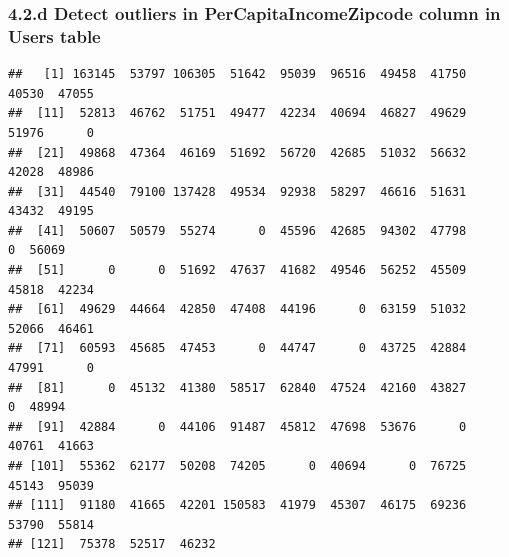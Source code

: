 \documentclass[
]{article}
\newenvironment{Shaded}{\begin{snugshade}}{\end{snugshade}}
\newcommand{\CommentTok}[1]{\textcolor[rgb]{0.56,0.35,0.01}{\textit{#1}}}
\newcommand{\FloatTok}[1]{\textcolor[rgb]{0.00,0.00,0.81}{#1}}
\newcommand{\FunctionTok}[1]{\textcolor[rgb]{0.13,0.29,0.53}{\textbf{#1}}}
\newcommand{\NormalTok}[1]{#1}
\newcommand{\OtherTok}[1]{\textcolor[rgb]{0.56,0.35,0.01}{#1}}
\newcommand{\SpecialCharTok}[1]{\textcolor[rgb]{0.81,0.36,0.00}{\textbf{#1}}}
\begin{document}
\subsubsection{4.2.d Detect outliers in PerCapitaIncomeZipcode column in
Users
table}\label{d-detect-outliers-in-percapitaincomezipcode-column-in-users-table}

\begin{Shaded}
\end{Shaded}

\begin{verbatim}
##   [1] 163145  53797 106305  51642  95039  96516  49458  41750  40530  47055
##  [11]  52813  46762  51751  49477  42234  40694  46827  49629  51976      0
##  [21]  49868  47364  46169  51692  56720  42685  51032  56632  42028  48986
##  [31]  44540  79100 137428  49534  92938  58297  46616  51631  43432  49195
##  [41]  50607  50579  55274      0  45596  42685  94302  47798      0  56069
##  [51]      0      0  51692  47637  41682  49546  56252  45509  45818  42234
##  [61]  49629  44664  42850  47408  44196      0  63159  51032  52066  46461
##  [71]  60593  45685  47453      0  44747      0  43725  42884  47991      0
##  [81]      0  45132  41380  58517  62840  47524  42160  43827      0  48994
##  [91]  42884      0  44106  91487  45812  47698  53676      0  40761  41663
## [101]  55362  62177  50208  74205      0  40694      0  76725  45143  95039
## [111]  91180  41665  42201 150583  41979  45307  46175  69236  53790  55814
## [121]  75378  52517  46232
\end{verbatim}
\end{document}
